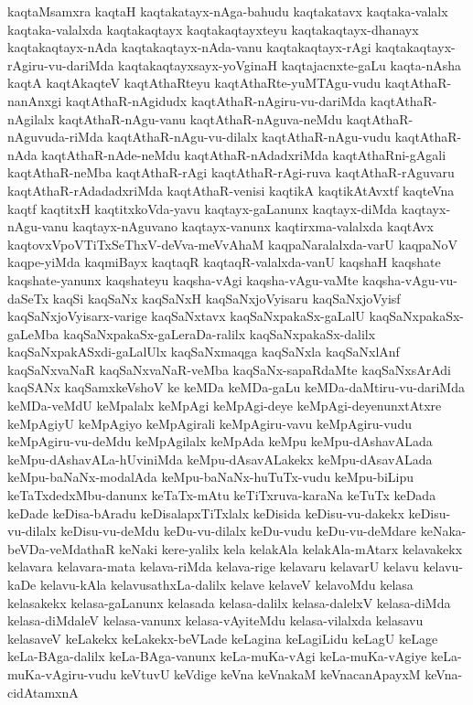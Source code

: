 {kaqtaMsamxra
kaqtaH
kaqtakatayx-nAga-bahudu
kaqtakatavx
kaqtaka-valalx
kaqtaka-valalxda
kaqtakaqtayx
kaqtakaqtayxteyu
kaqtakaqtayx-dhanayx
kaqtakaqtayx-nAda
kaqtakaqtayx-nAda-vanu
kaqtakaqtayx-rAgi
kaqtakaqtayx-rAgiru-vu-dariMda
kaqtakaqtayxsayx-yoVginaH
kaqtajacnxte-gaLu
kaqta-nAsha
kaqtA
kaqtAkaqteV
kaqtAthaRteyu
kaqtAthaRte-yuMTAgu-vudu
kaqtAthaR-nanAnxgi
kaqtAthaR-nAgidudx
kaqtAthaR-nAgiru-vu-dariMda
kaqtAthaR-nAgilalx
kaqtAthaR-nAgu-vanu
kaqtAthaR-nAguva-neMdu
kaqtAthaR-nAguvuda-riMda
kaqtAthaR-nAgu-vu-dilalx
kaqtAthaR-nAgu-vudu
kaqtAthaR-nAda
kaqtAthaR-nAde-neMdu
kaqtAthaR-nAdadxriMda
kaqtAthaRni-gAgali
kaqtAthaR-neMba
kaqtAthaR-rAgi
kaqtAthaR-rAgi-ruva
kaqtAthaR-rAguvaru
kaqtAthaR-rAdadadxriMda
kaqtAthaR-venisi
kaqtikA
kaqtikAtAvxtf
kaqteVna
kaqtf
kaqtitxH
kaqtitxkoVda-yavu
kaqtayx-gaLanunx
kaqtayx-diMda
kaqtayx-nAgu-vanu
kaqtayx-nAguvano
kaqtayx-vanunx
kaqtirxma-valalxda
kaqtAvx
kaqtovxVpoVTiTxSeThxV-deVva-meVvAhaM
kaqpaNaralalxda-varU
kaqpaNoV
kaqpe-yiMda
kaqmiBayx
kaqtaqR
kaqtaqR-valalxda-vanU
kaqshaH
kaqshate
kaqshate-yanunx
kaqshateyu
kaqsha-vAgi
kaqsha-vAgu-vaMte
kaqsha-vAgu-vu-daSeTx
kaqSi
kaqSaNx
kaqSaNxH
kaqSaNxjoVyisaru
kaqSaNxjoVyisf
kaqSaNxjoVyisarx-varige
kaqSaNxtavx
kaqSaNxpakaSx-gaLalU
kaqSaNxpakaSx-gaLeMba
kaqSaNxpakaSx-gaLeraDa-ralilx
kaqSaNxpakaSx-dalilx
kaqSaNxpakASxdi-gaLalUlx
kaqSaNxmaqga
kaqSaNxla
kaqSaNxlAnf
kaqSaNxvaNaR
kaqSaNxvaNaR-veMba
kaqSaNx-sapaRdaMte
kaqSaNxsArAdi
kaqSANx
kaqSamxkeVshoV
ke
keMDa
keMDa-gaLu
keMDa-daMtiru-vu-dariMda
keMDa-veMdU
keMpalalx
keMpAgi
keMpAgi-deye
keMpAgi-deyenunxtAtxre
keMpAgiyU
keMpAgiyo
keMpAgirali
keMpAgiru-vavu
keMpAgiru-vudu
keMpAgiru-vu-deMdu
keMpAgilalx
keMpAda
keMpu
keMpu-dAshavALada
keMpu-dAshavALa-hUviniMda
keMpu-dAsavALakekx
keMpu-dAsavALada
keMpu-baNaNx-modalAda
keMpu-baNaNx-huTuTx-vudu
keMpu-biLipu
keTaTxdedxMbu-danunx
keTaTx-mAtu
keTiTxruva-karaNa
keTuTx
keDada
keDade
keDisa-bAradu
keDisalapxTiTxlalx
keDisida
keDisu-vu-dakekx
keDisu-vu-dilalx
keDisu-vu-deMdu
keDu-vu-dilalx
keDu-vudu
keDu-vu-deMdare
keNaka-beVDa-veMdathaR
keNaki
kere-yalilx
kela
kelakAla
kelakAla-mAtarx
kelavakekx
kelavara
kelavara-mata
kelava-riMda
kelava-rige
kelavaru
kelavarU
kelavu
kelavu-kaDe
kelavu-kAla
kelavusathxLa-dalilx
kelave
kelaveV
kelavoMdu
kelasa
kelasakekx
kelasa-gaLanunx
kelasada
kelasa-dalilx
kelasa-dalelxV
kelasa-diMda
kelasa-diMdaleV
kelasa-vanunx
kelasa-vAyiteMdu
kelasa-vilalxda
kelasavu
kelasaveV
keLakekx
keLakekx-beVLade
keLagina
keLagiLidu
keLagU
keLage
keLa-BAga-dalilx
keLa-BAga-vanunx
keLa-muKa-vAgi
keLa-muKa-vAgiye
keLa-muKa-vAgiru-vudu
keVtuvU
keVdige
keVna
keVnakaM
keVnacanApayxM
keVna-cidAtamxnA
}
